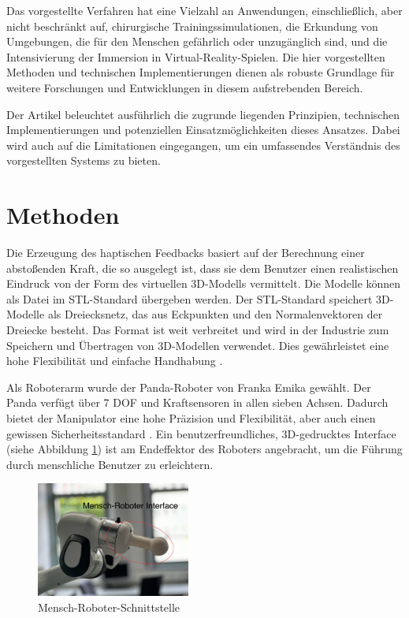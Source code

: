 \documentclass[conference]{IEEEtran}
\begin{document}
Das vorgestellte Verfahren hat eine Vielzahl an Anwendungen, einschließlich, aber nicht beschränkt auf, chirurgische Trainingssimulationen, die Erkundung von Umgebungen, die für den Menschen gefährlich oder unzugänglich sind, und die Intensivierung der Immersion in Virtual-Reality-Spielen. Die hier vorgestellten Methoden und technischen Implementierungen dienen als robuste Grundlage für weitere Forschungen und Entwicklungen in diesem aufstrebenden Bereich.

Der Artikel beleuchtet ausführlich die zugrunde liegenden Prinzipien, technischen Implementierungen und potenziellen Einsatzmöglichkeiten dieses Ansatzes. Dabei wird auch auf die Limitationen eingegangen, um ein umfassendes Verständnis des vorgestellten Systems zu bieten.

\section{Methoden}
Die Erzeugung des haptischen Feedbacks basiert auf der Berechnung einer abstoßenden Kraft, die so ausgelegt ist, dass sie dem Benutzer einen realistischen Eindruck von der Form des virtuellen 3D-Modells vermittelt. Die Modelle können als Datei im STL-Standard übergeben werden. Der STL-Standard speichert 3D-Modelle als Dreiecksnetz, das aus Eckpunkten und den Normalenvektoren der Dreiecke besteht. Das Format ist weit verbreitet und wird in der Industrie zum Speichern und Übertragen von 3D-Modellen verwendet. Dies gewährleistet eine hohe Flexibilität und einfache Handhabung \autocite{WasIstSTLDatei2017}.

Als Roboterarm wurde der Panda-Roboter von Franka Emika gewählt. Der Panda verfügt über 7 DOF und Kraftsensoren in allen sieben Achsen. Dadurch bietet der Manipulator eine hohe Präzision und Flexibilität, aber auch einen gewissen Sicherheitsstandard \cite{pandaDatasheet}. Ein benutzerfreundliches, 3D-gedrucktes Interface (siehe Abbildung \ref{fig:MRinterface}) ist am Endeffektor des Roboters angebracht, um die Führung durch menschliche Benutzer zu erleichtern.

\begin{figure}
    \centering
    \includegraphics[width=0.45\textwidth]{pics/interface.jpeg}
    \caption{Mensch-Roboter-Schnittstelle}
    \label{fig:MRinterface}
\end{figure}
\end{document}
